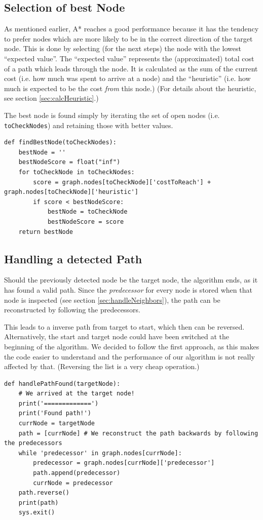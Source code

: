 \documentclass[12pt]{article}
\begin{document}
\subsection{Selection of best Node}
\label{sec:findBestNode}
As mentioned earlier, A* reaches a good performance because it has the tendency to prefer nodes which are more likely to be in the correct direction of the target node.
This is done by selecting (for the next steps) the node with the lowest \enquote{expected value}.
The \enquote{expected value} represents the (approximated) total cost of a path which leads through the node.
It is calculated as the sum of the current cost (i.e. how much was spent to arrive at a node) and the \enquote{heuristic} (i.e. how much is expected to be the cost \textit{from} this node.)
(For details about the heuristic, see section \ref{sec:calcHeuristic}.)

The best node is found simply by iterating the set of open nodes (i.e. \texttt{toCheckNodes}) and retaining those with better values.
\begin{lstlisting}
def findBestNode(toCheckNodes):
	bestNode = ''
	bestNodeScore = float("inf")
	for toCheckNode in toCheckNodes:
		score = graph.nodes[toCheckNode]['costToReach'] + graph.nodes[toCheckNode]['heuristic']
		if score < bestNodeScore:
			bestNode = toCheckNode
			bestNodeScore = score
	return bestNode
\end{lstlisting}

\subsection{Handling a detected Path}
\label{sec:handlePathFound}
Should the previously detected node be the target node, the algorithm ends, as it has found a valid path.
Since the \textit{predecessor} for every node is stored when that node is inspected (see section \ref{sec:handleNeighbors}), the path can be reconstructed by following the predecessors.

This leads to a inverse path from target to start, which then can be reversed.
Alternatively, the start and target node could have been switched at the beginning of the algorithm.
We decided to follow the first approach, as this makes the code easier to understand and the performance of our algorithm is not really affected by that.
(Reversing the list is a very cheap operation.)
\begin{lstlisting}
def handlePathFound(targetNode):
	# We arrived at the target node!
	print('=============')
	print('Found path!')
	currNode = targetNode
	path = [currNode] # We reconstruct the path backwards by following the predecessors
	while 'predecessor' in graph.nodes[currNode]:
		predecessor = graph.nodes[currNode]['predecessor']
		path.append(predecessor)
		currNode = predecessor
	path.reverse()
	print(path)
	sys.exit()
\end{lstlisting}
\end{document}
